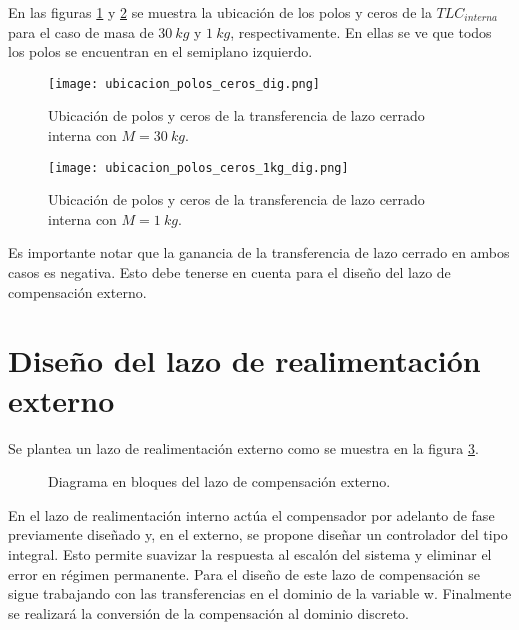 En las figuras \ref{fig:ubicacion_polos_y_ceros_dig} y \ref{fig:ubicacion_polos_y_ceros_1kg_dig} se muestra la ubicación de los polos y ceros de la $TLC_{interna}$ para el caso de masa de $30\:kg$ y $1\:kg$, respectivamente. En ellas se ve que todos los polos se encuentran en el semiplano izquierdo. 

\begin{figure}[H]
	\centering
	\texttt{[image: ubicacion\_polos\_ceros\_dig.png]}
	\caption{Ubicación de polos y ceros de la transferencia de lazo cerrado interna con $M=30\:kg$.}
	\label{fig:ubicacion_polos_y_ceros_dig}
\end{figure}

\begin{figure}[H]
	\centering
	\texttt{[image: ubicacion\_polos\_ceros\_1kg\_dig.png]}
	\caption{Ubicación de polos y ceros de la transferencia de lazo cerrado interna con $M=1\:kg$.}
	\label{fig:ubicacion_polos_y_ceros_1kg_dig}
\end{figure}

Es importante notar que la ganancia de la transferencia de lazo cerrado en ambos casos es negativa. Esto debe tenerse en cuenta para el diseño del lazo de compensación externo.





\section{Diseño del lazo de realimentación externo}

\noindent Se plantea un lazo de realimentación externo como se muestra en la figura \ref{fig:diag-externo_dig}. 

\begin{figure}[H]
	\centering
	
	\caption{Diagrama en bloques del lazo de compensación externo.}	\label{fig:diag-externo_dig}
\end{figure}

En el lazo de realimentación interno actúa el compensador por adelanto de fase previamente diseñado y, en el externo, se propone diseñar un controlador del tipo integral. Esto permite suavizar la respuesta al escalón del sistema y eliminar el error en régimen permanente. Para el diseño de este lazo de compensación se sigue trabajando con las transferencias en el dominio de la variable w. Finalmente se realizará la conversión de la compensación al dominio discreto.



